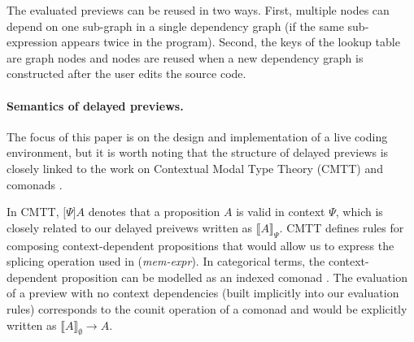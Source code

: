 \documentclass[sigplan,10pt,review,anonymous]{acmart}\settopmatter{printfolios=true,printccs=false,printacmref=false}
\theoremstyle{plain}
\theoremstyle{definition}
\begin{document}
The evaluated previews can be reused in two ways. First, multiple nodes can 
depend on one sub-graph in a single dependency graph (if the same sub-expression appears
twice in the program). Second, the keys of the lookup table are graph nodes and nodes are 
reused when a new dependency graph is constructed after the user edits the source code.

\paragraph{Semantics of delayed previews.}
The focus of this paper is on the design and implementation of a live coding environment, 
but it is worth noting that the structure of delayed previews is closely linked to the work
on Contextual Modal Type Theory (CMTT) \cite{cmtt} and comonads \cite{cmtt-denotation}. 

In CMTT, $\lbrack \Psi \rbrack A$ denotes that a proposition $A$ is valid in context $\Psi$,
which is closely related to our delayed preivews written as $\llbracket A \rrbracket_\Psi$.
CMTT defines rules for composing context-dependent propositions that would allow us to express
the splicing operation used in (\emph{mem-expr}). In categorical terms, the context-dependent
proposition can be modelled as an indexed comonad \cite{effectrev,graded}. The evaluation of a preview with no 
context dependencies (built implicitly into our evaluation rules) corresponds to the counit
operation of a comonad and would be explicitly written as $\llbracket A \rrbracket_\emptyset \rightarrow A$.

\end{document}
